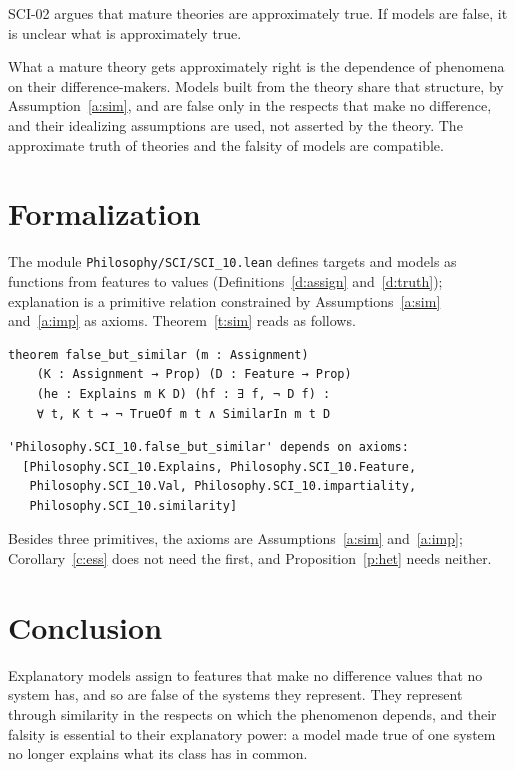 \documentclass{situationist-preprint}
\begin{document}
\begin{objection}
SCI-02 argues that mature theories are approximately true. If models are false, it is unclear what is approximately true.
\end{objection}

\begin{reply}
What a mature theory gets approximately right is the dependence of phenomena on their difference-makers. Models built from the theory share that structure, by Assumption~\ref{a:sim}, and are false only in the respects that make no difference, and their idealizing assumptions are used, not asserted by the theory. The approximate truth of theories and the falsity of models are compatible.
\end{reply}

\section{Formalization}

The module \nolinkurl{Philosophy/SCI/SCI_10.lean} defines targets and models as functions from features to values (Definitions~\ref{d:assign} and~\ref{d:truth}); explanation is a primitive relation constrained by Assumptions~\ref{a:sim} and~\ref{a:imp} as axioms. Theorem~\ref{t:sim} reads as follows.

\begin{lstlisting}
theorem false_but_similar (m : Assignment)
    (K : Assignment → Prop) (D : Feature → Prop)
    (he : Explains m K D) (hf : ∃ f, ¬ D f) :
    ∀ t, K t → ¬ TrueOf m t ∧ SimilarIn m t D
\end{lstlisting}

\begin{lstlisting}
'Philosophy.SCI_10.false_but_similar' depends on axioms:
  [Philosophy.SCI_10.Explains, Philosophy.SCI_10.Feature,
   Philosophy.SCI_10.Val, Philosophy.SCI_10.impartiality,
   Philosophy.SCI_10.similarity]
\end{lstlisting}

Besides three primitives, the axioms are Assumptions~\ref{a:sim} and~\ref{a:imp}; Corollary~\ref{c:ess} does not need the first, and Proposition~\ref{p:het} needs neither.

\section{Conclusion}

Explanatory models assign to features that make no difference values that no system has, and so are false of the systems they represent. They represent through similarity in the respects on which the phenomenon depends, and their falsity is essential to their explanatory power: a model made true of one system no longer explains what its class has in common.
\end{document}

